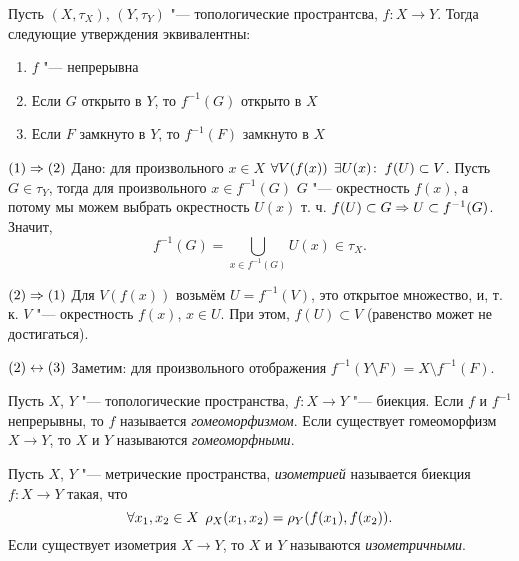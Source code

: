 \documentclass[main]{subfiles}
\begin{document}
\begin{theorem}
  Пусть \( (X, \tau_X) \), \( (Y, \tau_Y) \) "--- топологические пространтсва,
  \( f : X \to Y \). Тогда следующие утверждения
  эквивалентны:
  \begin{enumerate}
    \item \( f \) "--- непрерывна
    \item Если \( G \) открыто в \( Y \), то
      \( f^{-1}(G) \) открыто в \( X \)
    \item Если \( F \) замкнуто в \( Y \), то
      \( f^{-1}(F) \) замкнуто в \( X \)
  \end{enumerate}
\end{theorem}
\begin{itemproof}
  \item[\( (1) \Rightarrow (2) \)] Дано: для произвольного \( x \in X \)
    \( \forall {V(f(x))} \; \, \exists U(x) \colon \: f(U) \subset V \).
    Пусть  \( G \in \tau_Y \), тогда для произвольного \( x \in f^{-1}(G) \)
    \( G \) "--- окрестность \( f(x) \), а потому
    мы можем выбрать окрестность \( U(x) \) т. ч. \( f(U) \subset G \Rightarrow
    U \subset f^{-1}(G) \). Значит,
    \[
      f^{-1}(G) = \bigcup_{x \in f^{-1}(G)} U(x) \in \tau_X.
    \]

  \item[\( (2) \Rightarrow (1) \)]
    Для \( V(f(x)) \) возьмём \( U = f^{-1}(V) \),
    это открытое множество, и, т. к. \( V \) "--- окрестность \( f(x) \),
    \( x \in U \). При этом, \( f(U) \subset V \) 
    (равенство может не достигаться).

  \item[\( (2) \leftrightarrow (3) \)]
    Заметим: для произвольного отображения
    \( f^{-1}(Y \setminus F) = X \setminus f^{-1}(F) \).
\end{itemproof}

\begin{definition}
  Пусть \( X \), \( Y \) "--- топологические пространства,
  \( f : X \to Y \) "--- биекция. Если \( f \) и \( f^{-1} \)
  непрерывны, то \( f \) называется \emph{гомеоморфизмом}.
  Если существует гомеоморфизм \( X \to Y \), то
  \( X \) и \( Y \) называются \emph{гомеоморфными}.
\end{definition}

\begin{definition}
  Пусть \( X \), \( Y \) "--- метрические пространства,
  \emph{изометрией} называется биекция \( f : X \to Y \) такая,
  что
  \[
    \forall {x_1, x_2 \in X} \; \, \rho_X(x_1, x_2) = \rho_Y(f(x_1), f(x_2)).
  \]
  Если существует изометрия \( X \to Y \), то
  \( X \) и \( Y \) называются \emph{изометричными}.
\end{definition}
\end{document}
